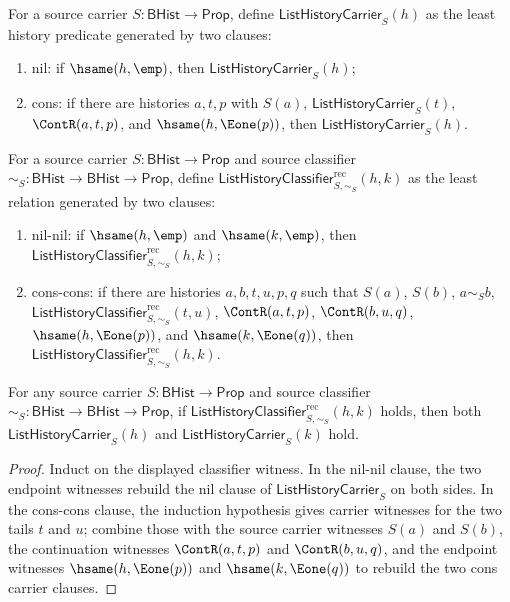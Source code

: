 \begin{definition}
\label{def:list-history-carrier}
For a source carrier $S:\mathsf{BHist}\to\mathsf{Prop}$, define $\mathsf{ListHistoryCarrier}_S(h)$ as the least history predicate generated by two clauses:
\begin{enumerate}
  \item nil: if $\hsame(h,\emp)$, then $\mathsf{ListHistoryCarrier}_S(h)$;
  \item cons: if there are histories $a,t,p$ with $S(a)$, $\mathsf{ListHistoryCarrier}_S(t)$, $\ContR(a,t,p)$, and $\hsame(h,\Eone(p))$, then $\mathsf{ListHistoryCarrier}_S(h)$.
\end{enumerate}
\end{definition}

\begin{definition}
\label{def:list-history-classifier}
For a source carrier $S:\mathsf{BHist}\to\mathsf{Prop}$ and source classifier
$\sim_S:\mathsf{BHist}\to\mathsf{BHist}\to\mathsf{Prop}$, define
$\mathsf{ListHistoryClassifier}^{\mathrm{rec}}_{S,\sim_S}(h,k)$ as the least relation
generated by two clauses:
\begin{enumerate}
  \item nil-nil: if $\hsame(h,\emp)$ and $\hsame(k,\emp)$, then
  $\mathsf{ListHistoryClassifier}^{\mathrm{rec}}_{S,\sim_S}(h,k)$;
  \item cons-cons: if there are histories $a,b,t,u,p,q$ such that $S(a)$,
  $S(b)$, $a\sim_S b$, $\mathsf{ListHistoryClassifier}^{\mathrm{rec}}_{S,\sim_S}(t,u)$,
  $\ContR(a,t,p)$, $\ContR(b,u,q)$, $\hsame(h,\Eone(p))$, and
  $\hsame(k,\Eone(q))$, then
  $\mathsf{ListHistoryClassifier}^{\mathrm{rec}}_{S,\sim_S}(h,k)$.
\end{enumerate}
\end{definition}

\begin{theorem}
\label{thm:list-history-classifier-carrier-endpoints}
For any source carrier $S:\mathsf{BHist}\to\mathsf{Prop}$ and source classifier
$\sim_S:\mathsf{BHist}\to\mathsf{BHist}\to\mathsf{Prop}$, if
$\mathsf{ListHistoryClassifier}^{\mathrm{rec}}_{S,\sim_S}(h,k)$ holds, then both
$\mathsf{ListHistoryCarrier}_S(h)$ and $\mathsf{ListHistoryCarrier}_S(k)$
hold.
\end{theorem}
\begin{proof}
Induct on the displayed classifier witness. In the nil-nil clause, the two
endpoint witnesses rebuild the nil clause of $\mathsf{ListHistoryCarrier}_S$
on both sides. In the cons-cons clause, the induction hypothesis gives carrier
witnesses for the two tails $t$ and $u$; combine those with the source carrier
witnesses $S(a)$ and $S(b)$, the continuation witnesses $\ContR(a,t,p)$ and
$\ContR(b,u,q)$, and the endpoint witnesses $\hsame(h,\Eone(p))$ and
$\hsame(k,\Eone(q))$ to rebuild the two cons carrier clauses.
\end{proof}

